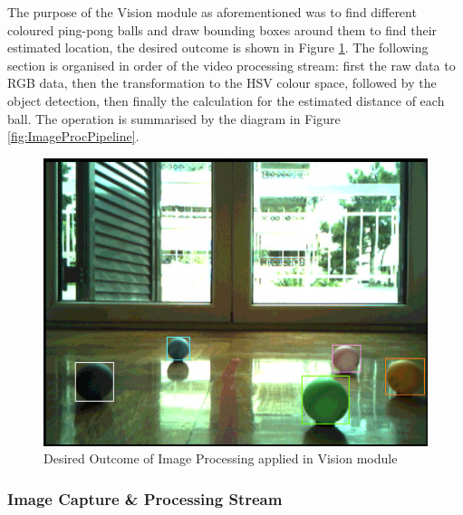 \documentclass[a4paper]{article}
\begin{document}
The purpose of the Vision module as aforementioned was to find different coloured
ping-pong balls and draw bounding boxes around them to find their estimated location, 
the desired outcome is shown in Figure \ref{fig:DesiredVisionResult}. The following 
section is organised in order of the video processing stream: first the raw data to 
RGB data, then the transformation to the HSV colour space, followed by the object 
detection, then finally the calculation for the estimated distance of each ball.
The operation is summarised by the diagram in Figure \ref{fig:ImageProcPipeline}.  

\begin{figure}[H]
	\begin{Center}
		\includegraphics[scale = 0.3]{./images/AnnotatedBalls.png}
		\caption{Desired Outcome of Image Processing applied in Vision module }
		\label{fig:DesiredVisionResult}
	\end{Center}
\end{figure}



 

\subsubsection{Image Capture \& Processing Stream}
\end{document}
